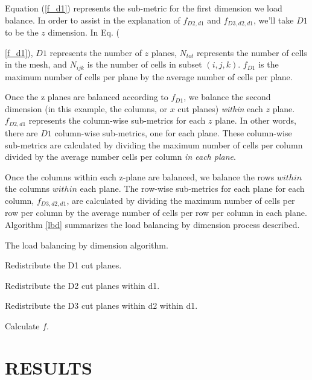 \documentclass[letterpaper]{mandc2019}
\begin{document}
Equation (\ref{f_d1}) represents the sub-metric for the first dimension we load balance. In order to assist in the explanation of $f_{D2,d1}$ and $f_{D3,d2,d1}$, we'll take $D1$ to be the $z$ dimension. In Eq. ({\ref{f_d1}), $D1$ represents the number of $z$ planes, $N_{tot}$ represents the number of cells in the mesh, and $N_{ijk}$ is the number of cells in subset $(i,j,k)$. $f_{D1}$ is the maximum number of cells per plane by the average number of cells per plane. 

Once the z planes are balanced according to $f_{D1}$, we balance the second dimension (in this example, the columns, or $x$ cut planes) \textit{within} each $z$ plane. $f_{D2,d1}$ represents the column-wise sub-metrics for each $z$ plane. In other words, there are $D1$ column-wise sub-metrics, one for each plane. These column-wise sub-metrics are calculated by dividing the maximum number of cells per column divided by the average number cells per column \textit{in each plane}. 

Once the columns within each z-plane are balanced, we balance the rows $within$ the columns $within$ each plane. The row-wise sub-metrics for each plane for each column, $f_{D3,d2,d1}$, are calculated by dividing the maximum number of cells per row per column by the average number of cells per row per column in each plane. Algorithm \ref{lbd} summarizes the load balancing by dimension process described.

\begin{algorithm}[htb]
\caption{The load balancing by dimension algorithm.}
\label{lbd}
\begin{algorithmic}

    \STATE Redistribute the D1 cut planes.
  \ENDWHILE  
  
      \STATE Redistribute the D2 cut planes within d1. 
    \ENDWHILE
  \ENDFOR
  
        \STATE Redistribute the D3 cut planes within d2 within d1. 
      \ENDWHILE
    \ENDFOR
  \ENDFOR
  
  \STATE Calculate $f$.
\end{algorithmic}
\end{algorithm}

\section{RESULTS}

}
\end{document}
